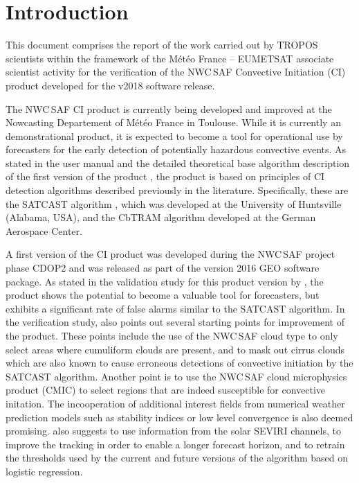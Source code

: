\chapter{Introduction}
This document comprises the report of the work carried out by TROPOS scientists within the framework of the M\'{e}t\'{e}o France -- EUMETSAT associate scientist activity for the verification of the NWC\,SAF Convective Initiation (CI) product developed for the v2018 software release. 

The NWC\,SAF CI product is currently being developed and improved at the Nowcasting Departement of M\'{e}t\'{e}o France in Toulouse. While it is currently an demonstrational product, it is expected to become a tool for operational use by forecasters for the early detection of potentially hazardous convective events. As stated in the user manual and the detailed theoretical base algorithm description of the first version of the product \citep{Autones2016a, Autones2016b}, the product is based on principles of CI detection algorithms described previously in the literature.  Specifically, these are the SATCAST algorithm \citep{MecikalskiBedka2006, MecikalskiBedkaPaechEtAl2008, SieglaffCronceFeltzEtAl2011}, which was developed at the University of Huntsville (Alabama, USA), and the  CbTRAM algorithm \citep{ZinnerMannsteinTafferner2008, MerkZinner2013} developed at the German Aerospace Center. 

A first version of the CI product was developed during the NWC\,SAF project phase CDOP2 and was released as part of the version 2016 GEO software package. As stated in the validation study for this product version by \citet{Karagiannidis2016}, the product shows the potential to become a valuable tool for forecasters, but exhibits a significant rate of false alarms similar to the SATCAST algorithm. In the verification study, \citet{Karagiannidis2016} also points out several starting points for improvement of the product. These points include the use of the NWC\,SAF cloud type to only select areas where cumuliform clouds are present, and to mask out cirrus clouds which are also known to cause erroneous detections of convective initiation by the SATCAST algorithm. Another point is to use the NWC\,SAF cloud microphysics product (CMIC) to select regions that are indeed susceptible for convective initation. The incooperation of additional interest fields from numerical weather prediction models such as stability indices or low level convergence is also deemed promising. \citet{Karagiannidis2016} also suggests to use information from the solar SEVIRI channels, to improve the tracking in order to enable a longer forecast horizon, and to retrain the thresholds used by the current and future versions of the algorithm based on logistic regression.

